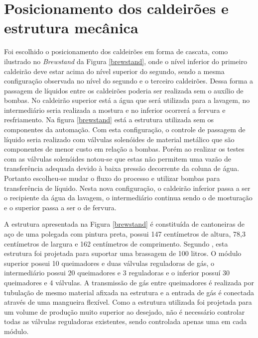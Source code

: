 		\section{Posicionamento dos caldeirões e estrutura mecânica}
Foi escolhido o posicionamento dos caldeirões em forma de cascata, como ilustrado no \textit{Brewstand} da Figura \ref{brewstand}, onde o nível inferior do primeiro caldeirão deve estar acima do nível superior do segundo, sendo a mesma configuração observada no nível do segundo e o terceiro caldeirões. Dessa forma a passagem de líquidos entre os caldeirões poderia ser realizada sem o auxílio de bombas. No caldeirão superior está a água que será utilizada para a lavagem, no intermediário seria realizada a mostura e no inferior ocorrerá a fervura e resfriamento. Na figura \ref{brewstand} está a estrutura utilizada sem os componentes da automação. Com esta configuração, o controle de passagem de líquido seria realizado com válvulas solenóides de material metálico que são componentes de menor custo em relação a bombas. Porém ao realizar os testes com as válvulas solenóides notou-se que estas não permitem uma vazão de transferência adequada devido à baixa pressão decorrente da coluna de água. Portanto escolheu-se mudar o fluxo do processo e utilizar bombas para transferência de líquido. Nesta nova configuração, o caldeirão inferior passa a ser o recipiente da água da lavagem, o intermediário continua sendo o de mosturação e o superior passa a ser o de fervura.

A estrutura apresentada na Figura \ref{brewstand} é constituída de cantoneiras de aço de uma polegada com pintura preta, possui 147 centímetros de altura, 78,3 centímetros de largura e 162 centímetros de comprimento. Segundo , esta estrutura foi projetada para suportar uma brassagem de 100 litros. O módulo superior possui 10 queimadores e duas válvulas reguladoras de gás, o intermediário possui 20 queimadores e 3 reguladoras e o inferior possuí 30 queimadores e 4 válvulas. A transmissão de gás entre queimadores é realizada por tubulação de mesmo material afixada na estrutura e a entrada de gás é conectada através de uma mangueira flexível. Como a estrutura utilizada foi projetada para um volume de produção muito superior ao desejado, não é necessário controlar todas as válvulas reguladoras existentes,  sendo controlada apenas uma em cada módulo.

